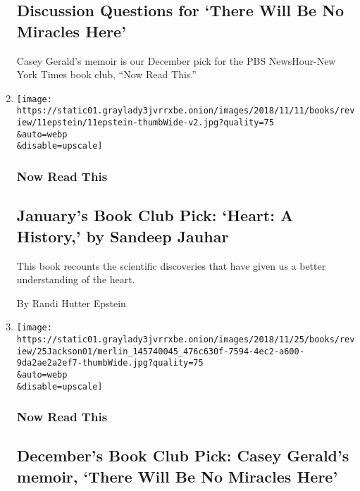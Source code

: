 \begin{enumerate}
  \hypertarget{discussion-questions-for-there-will-be-no-miracles-here}{%
  \subsection{Discussion Questions for `There Will Be No Miracles
  Here'}\label{discussion-questions-for-there-will-be-no-miracles-here}}

  Casey Gerald's memoir is our December pick for the PBS NewsHour-New
  York Times book club, ``Now Read This.''
\item
  \href{/2018/11/05/books/review/heart-sandeep-jauhar.html}{}

  \texttt{[image: https://static01.graylady3jvrrxbe.onion/images/2018/11/11/books/review/11epstein/11epstein-thumbWide-v2.jpg?quality=75\\\&auto=webp\\\&disable=upscale]}

  \hypertarget{now-read-this-7}{%
  \subsubsection{Now Read This}\label{now-read-this-7}}

  \hypertarget{januarys-book-club-pick-heart-a-history-by-sandeep-jauhar}{%
  \subsection{January's Book Club Pick: `Heart: A History,' by Sandeep
  Jauhar}\label{januarys-book-club-pick-heart-a-history-by-sandeep-jauhar}}

  This book recounts the scientific discoveries that have given us a
  better understanding of the heart.

  By Randi Hutter Epstein
\item
  \href{/2018/10/24/books/review/casey-gerald-memoir-there-will-be-no-miracles-here.html}{}

  \texttt{[image: https://static01.graylady3jvrrxbe.onion/images/2018/11/25/books/review/25Jackson01/merlin\_145740045\_476c630f-7594-4ec2-a600-9da2ae2a2ef7-thumbWide.jpg?quality=75\\\&auto=webp\\\&disable=upscale]}

  \hypertarget{now-read-this-8}{%
  \subsubsection{Now Read This}\label{now-read-this-8}}

  \hypertarget{decembers-book-club-pick-casey-geralds-memoir-there-will-be-no-miracles-here}{%
  \subsection{December's Book Club Pick: Casey Gerald's memoir, `There
  Will Be No Miracles
  Here'}\label{decembers-book-club-pick-casey-geralds-memoir-there-will-be-no-miracles-here}}


\end{enumerate}
